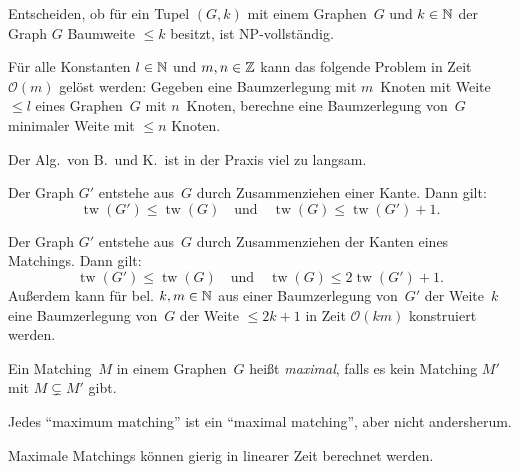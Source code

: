 \documentclass{cheat-sheet}
\renewcommand{\O}{\mathcal{O}} %
\DeclareMathOperator{\treewidth}{tw} %
\newcommand{\Youtube}[1]{\href{https://www.youtube.com/watch?v=#1}{\textcolor{YoutubeColor}{$\blacktriangleright$}}}
\begin{document}
\begin{bem}
  Entscheiden, ob für ein Tupel $(G, k)$ mit einem Graphen~$G$ und $k \in \mathbb{N}$ der Graph $G$ Baumweite $\leq k$ besitzt, ist NP-vollständig.
\end{bem}

\begin{lem}
  Für alle Konstanten $l \in \mathbb{N}$ und $m, n \in \mathbb{Z}$ kann das folgende Problem in Zeit~$\O(m)$ gelöst werden:
  Gegeben eine Baumzerlegung mit $m$~Knoten mit Weite $\leq l$ eines Graphen~$G$ mit $n$~Knoten, berechne eine Baumzerlegung von~$G$ minimaler Weite mit $\leq n$ Knoten.
\end{lem}

\begin{bem}
  Der Alg.\ von B.\ und K.\ ist in der Praxis viel zu langsam.
\end{bem}

\begin{lem}
  Der Graph $G'$ entstehe aus~$G$ durch Zusammenziehen einer Kante.
  Dann gilt:
  \[
    \treewidth(G') \leq \treewidth(G)
    \quad \text{und} \quad
    \treewidth(G) \leq \treewidth(G') + 1.
  \]
\end{lem}

\begin{lem}
  Der Graph $G'$ entstehe aus~$G$ durch Zusammenziehen der Kanten eines Matchings.
  Dann gilt:
  \[
    \treewidth(G') \leq \treewidth(G)
    \quad \text{und} \quad
    \treewidth(G) \leq 2 \treewidth(G') + 1.
  \]
  Außerdem kann für bel. $k, m \in \mathbb{N}$ aus einer Baumzerlegung von~$G'$ der Weite~$k$ eine Baumzerlegung von~$G$ der Weite $\leq 2 k + 1$ in Zeit $\O(k m)$ konstruiert werden.
\end{lem}

\begin{defn}
  Ein Matching~$M$ in einem Graphen~$G$ heißt \emph{maximal}, falls es kein Matching $M'$ mit $M \subsetneq M'$ gibt.
\end{defn}

\begin{acht}[\Youtube{03PUwWef2Dg}, \Youtube{bOJC93XxoFc}]
  Jedes ``maximum matching'' ist ein ``maximal matching'', aber nicht andersherum.
\end{acht}

\begin{bem}[\Youtube{jtgBCGVux-8}]
  Maximale Matchings können gierig in linearer Zeit berechnet werden.
\end{bem}
\end{document}
